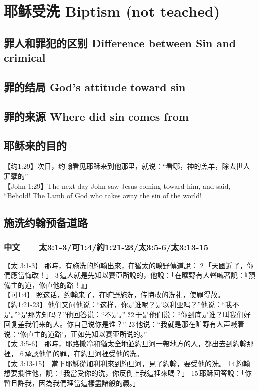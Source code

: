 \chapter{耶稣受洗 Biptism (not teached)}

\section{罪人和罪犯的区别 Difference between Sin and crimical}

\section{罪的结局 God's attitude toward sin }

\section{罪的来源 Where did sin comes from}

\section{耶稣来的目的}
【约1:29】次日，约翰看见耶稣来到他那里，就说：“看哪，神的羔羊，除去世人罪孽的”\\

【John 1:29】The next day John saw Jesus coming toward him, and said, “Behold! The Lamb of God who takes away the sin of the world!\\


\section{施洗约翰预备道路}
\subsection{中文——太3:1-3/可1:4/約1:21-23/太3:5-6/太3:13-15}
【太 3:1-3】 那時，有施洗的約翰出來，在猶太的曠野傳道說： 2 「天國近了，你們應當悔改！」 3 這人就是先知以賽亞所說的，他說：「在曠野有人聲喊著說：『預備主的道，修直他的路！』」\\
【可1:4】 照这话，约翰来了，在旷野施洗，传悔改的洗礼，使罪得赦。\\
【約1:21-23】 他们又问他说：“这样，你是谁呢？是以利亚吗？”他说：“我不是。”“是那先知吗？”他回答说：“不是。” 22 于是他们说：“你到底是谁？叫我们好回复差我们来的人。你自己说你是谁？” 23 他说：“我就是那在旷野有人声喊着说：‘修直主的道路’，正如先知以赛亚所说的。”\\
【太 3:5-6】 那時，耶路撒冷和猶太全地並約旦河一帶地方的人，都出去到約翰那裡， 6 承認他們的罪，在約旦河裡受他的洗。\\
【太 3:13-15】 當下耶穌從加利利來到約旦河，見了約翰，要受他的洗。 14 約翰想要攔住他，說：「我當受你的洗，你反倒上我這裡來嗎？」 15 耶穌回答說：「你暫且許我，因為我們理當這樣盡諸般的義。」\\


